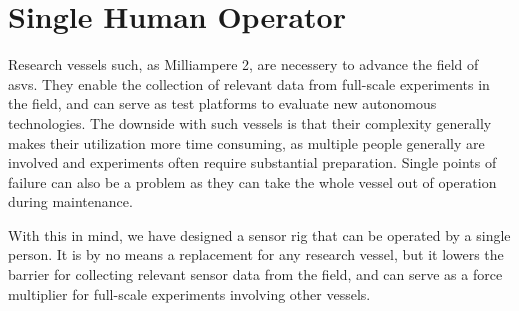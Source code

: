 \section{Single Human Operator}
Research vessels such, as Milliampere 2, are necessery to advance the field of \glspl{asv}.
They enable the collection of relevant data from full-scale experiments in the field, and can serve as test platforms to evaluate new autonomous technologies.
The downside with such vessels is that their complexity generally makes their utilization more time consuming, as multiple people generally are involved and experiments often require substantial preparation.
Single points of failure can also be a problem as they can take the whole vessel out of operation during maintenance.

With this in mind, we have designed a sensor rig that can be operated by a single person.
It is by no means a replacement for any research vessel, but it lowers the barrier for collecting relevant sensor data from the field, and can serve as a force multiplier for full-scale experiments involving other vessels.





